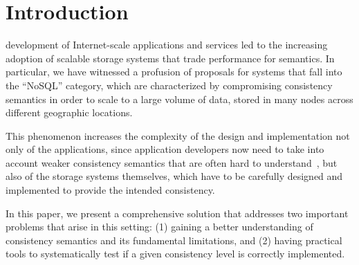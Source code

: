 \documentclass[journal, compsoc]{IEEEtran}
\begin{document}
\maketitle
	
	
	
	\IEEEpeerreviewmaketitle
	
	
	
	\section{Introduction}\label{sec:intro}%
	
	 development of Internet-scale applications and services led to the increasing adoption of scalable storage systems that trade performance for semantics. In particular, we have witnessed a profusion of proposals for  systems that fall into the ``NoSQL'' category, which are characterized by compromising consistency semantics in order to scale to a large volume of data, stored in many nodes across different geographic locations.
	
	
	This phenomenon increases the complexity of the design and implementation not only of the applications, since application developers now need to take into account weaker consistency semantics that are often hard to understand~\cite{Bailis:2015:FCC:2723372.2737784}, but also of the storage systems themselves, which have to be carefully designed and implemented to provide the intended consistency.
	
	In this paper, we present a comprehensive solution that addresses two important problems that arise in this setting: (1) gaining a better understanding of consistency semantics and its fundamental limitations, and (2) having practical tools to systematically test if a given consistency level is correctly implemented.
	
\end{document}
